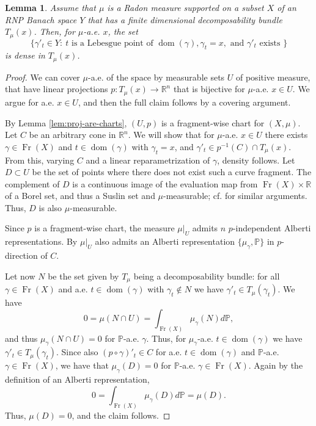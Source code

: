 \documentclass{amsart}
\newtheorem{lemma}[theorem]{Lemma}
\numberwithin{equation}{section}
\newcommand{\R}{\mathbb{R}}
\newcommand{\dom}{\operatorname{dom}}
\newcommand{\Fr}{\operatorname{Fr}}
\begin{document}
\begin{lemma}\label{lem:densityofdir} Assume that $\mu$ is a Radon measure supported on a subset $X$ of an RNP Banach space $Y$ that has a finite dimensional decomposability bundle $T_\mu(x)$. Then, for $\mu$-a.e. $x$, the set 
\[
\{\gamma'_t \in Y:\ t \text{ is a Lebesgue point of } \dom(\gamma), \gamma_t=x, \text{ and } \gamma'_t \text{ exists }\}
\]
is dense in $T_\mu(x)$.
\end{lemma}
\begin{proof}
    We can cover $\mu$-a.e. of the space by measurable sets $U$ of positive measure, that have linear projections $p:T_\mu(x)\to \R^n$ that is bijective for $\mu$-a.e. $x\in U$. We argue for a.e. $x\in U$, and then the full claim follows by a covering argument.

    By Lemma \ref{lem:proj-are-charts}, $(U,p)$ is a fragment-wise chart for $(X,\mu)$. Let $C$ be an arbitrary cone in $\R^n$. We will show that for $\mu$-a.e. $x\in U$ there exists $\gamma\in \Fr(X)$ and $t\in \dom(\gamma)$ with $\gamma_t=x$, and $\gamma'_t \in p^{-1}(C)\cap T_\mu(x)$. From this, varying $C$ and a linear reparametrization of $\gamma$, density follows. Let $D\subset U$ be the set of points where there does not exist such a curve fragment. The complement of $D$ is a continuous image of the evaluation map from $\Fr(X)\times \R$ of a Borel set, and thus a Suslin set and $\mu$-measurable; cf. \cite[Lemma A.1 and Lemma A.2]{ts24} for similar arguments. Thus, $D$ is also $\mu$-measurable.

    Since $p$ is a fragment-wise chart, the measure $\mu|_U$ admits $n$ $p$-independent Alberti representations. By \cite[Corollary 3.95]{sch16b} $\mu|_U$ also admits an Alberti representation $\{\mu_\gamma, \mathbb{P}\}$ in $p$-direction of $C$.

    Let now $N$ be the set given by $T_\mu$ being a decomposability bundle: for all $\gamma\in \Fr(X)$ and a.e. $t\in \dom(\gamma)$ with $\gamma_t\not\in N$ we have $\gamma'_t\in T_\mu(\gamma_t)$.  We have
    \[
    0=\mu(N\cap U)=\int_{\Fr(X)} \mu_\gamma(N) d\mathbb{P},
    \]
    and thus $\mu_\gamma(N\cap U)=0$ for $\mathbb{P}$-a.e. $\gamma$. Thus, for $\mu_\gamma$-a.e. $t\in \dom(\gamma)$ we have $\gamma'_t\in T_\mu(\gamma_t)$. Since also $(p\circ \gamma)'_t\in C$ for a.e. $t\in \dom(\gamma)$ and $\mathbb{P}$-a.e. $\gamma\in {\Fr(X)}$, we have that $\mu_\gamma(D)=0$ for $\mathbb{P}$-a.e. $\gamma\in {\Fr(X)}$. Again by the definition of an Alberti representation,
    \[
    0=\int_{\Fr(X)} \mu_\gamma(D) d\mathbb{P}=\mu(D).
    \]
    Thus, $\mu(D)=0$, and the claim follows.
\end{proof}
\end{document}
